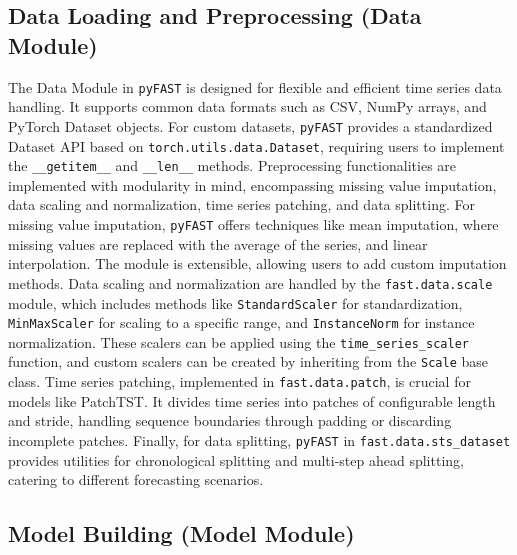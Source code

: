 \documentclass[twoside,11pt]{article}
\begin{document}
\subsection{Data Loading and Preprocessing (Data Module)}

The Data Module in \texttt{pyFAST} is designed for flexible and efficient time series data handling. It supports common data formats such as CSV, NumPy arrays, and PyTorch Dataset objects. For custom datasets, \texttt{pyFAST} provides a standardized Dataset API based on \texttt{torch.utils.data.Dataset}, requiring users to implement the \texttt{\_\_getitem\_\_} and \texttt{\_\_len\_\_} methods.  Preprocessing functionalities are implemented with modularity in mind, encompassing missing value imputation, data scaling and normalization, time series patching, and data splitting. For missing value imputation, \texttt{pyFAST} offers techniques like mean imputation, where missing values are replaced with the average of the series, and linear interpolation. The module is extensible, allowing users to add custom imputation methods. Data scaling and normalization are handled by the \texttt{fast.data.scale} module, which includes methods like \texttt{StandardScaler} for standardization, \texttt{MinMaxScaler} for scaling to a specific range, and \texttt{InstanceNorm} for instance normalization. These scalers can be applied using the \texttt{time\_series\_scaler} function, and custom scalers can be created by inheriting from the \texttt{Scale} base class. Time series patching, implemented in \texttt{fast.data.patch}, is crucial for models like PatchTST. It divides time series into patches of configurable length and stride, handling sequence boundaries through padding or discarding incomplete patches.  Finally, for data splitting, \texttt{pyFAST} in \texttt{fast.data.sts\_dataset} provides utilities for chronological splitting and multi-step ahead splitting, catering to different forecasting scenarios.

\subsection{Model Building (Model Module)}
\end{document}
